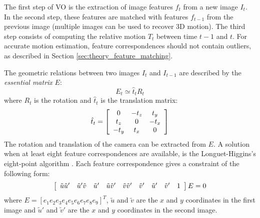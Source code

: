 The first step of VO is the extraction of image features $f_t$ from a new image $I_t$.
In the second step, these features are matched with features $f_{t-1}$ from the previous image (multiple images can be used to recover 3D motion).
The third step consists of computing the relative motion $T_t$ between time $t-1$ and $t$.
For accurate motion estimation, feature correspondences should not contain outliers, as described in Section \ref{sec:theory_feature_matching}.

The geometric relations between two images $I_t$ and $I_{t-1}$ are described by the \textit{essential matrix} $E$:
\begin{equation}
E_t \simeq \hat{t}_t R_t
\end{equation}
where $R_t$ is the rotation and $\hat{t}_t$ is the translation matrix:
\begin{equation}
\hat{t}_t = 
\left[ \begin{array}{c c c}
0 & -t_z & t_y \\
t_z & 0 & -t_x \\
-t_y & t_x & 0
\end{array} \right]
\end{equation}
The rotation and translation of the camera can be extracted from $E$.
A solution when at least eight feature correspondences are available, is the Longuet-Higgins's eight-point algorithm \cite{longuet1987computer}.
Each feature correspondence gives a constraint of the following form:
\begin{equation}
\left[ \begin{array}{c c c c c c c c c}
\tilde{u}\tilde{u}' & \tilde{u}'\tilde{v} & \tilde{u}' & \tilde{u}\tilde{v}' & \tilde{v}\tilde{v}' & \tilde{v}' & \tilde{u}' & \tilde{v}' & 1
\end{array} \right]
E = 0
\end{equation}
where $E = [e_1  e_2  e_3  e_4  e_5  e_6  e_7  e_8  e_9]^T$, 
$\tilde{u}$ and $\tilde{v}$ are the $x$ and $y$ coordinates in the first image and $\tilde{u}'$ and $\tilde{v}'$ are the $x$ and $y$ coordinates in the second image.

